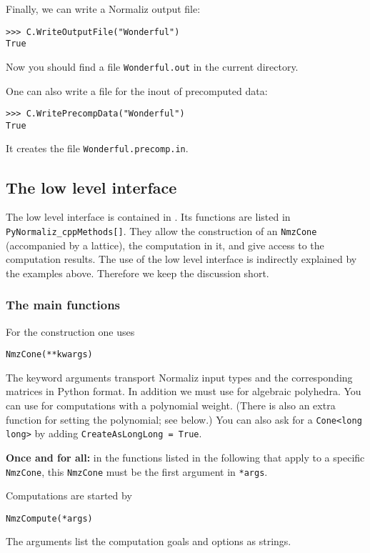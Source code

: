 \begin{small}
Finally, we can write a Normaliz output file:
\begin{Verbatim}
>>> C.WriteOutputFile("Wonderful")
True
\end{Verbatim}
Now you should find a file \verb|Wonderful.out| in the current directory.

One can also write a file for the inout of precomputed data:
\begin{Verbatim}
>>> C.WritePrecompData("Wonderful")
True
\end{Verbatim}
It creates the file \verb|Wonderful.precomp.in|.

\subsection{The low level interface}

The low level interface is contained in . Its functions are listed in\\ \verb|PyNormaliz_cppMethods[]|. They allow the construction of an \verb|NmzCone| (accompanied by a lattice), the computation in it, and give access to the computation results. The use of the low level interface is indirectly explained by the examples above. Therefore we keep the discussion short.

\subsubsection{The main functions}

For the construction one uses
\begin{Verbatim}
NmzCone(**kwargs)
\end{Verbatim}
The keyword arguments  transport Normaliz input types and the corresponding matrices in Python format. In addition we must use  for algebraic polyhedra. You can use  for computations with a polynomial weight. (There is also an extra function for setting the polynomial; see below.) You can also ask for a \verb|Cone<long long>| by adding \verb|CreateAsLongLong = True|.

\textbf{Once and for all:} in the functions listed in the following that apply to a specific \verb|NmzCone|, this \verb|NmzCone| must be the first argument in \verb|*args|.

Computations are started by
\begin{Verbatim}
NmzCompute(*args)
\end{Verbatim}
The arguments list the computation goals and options as strings.


\end{small}
